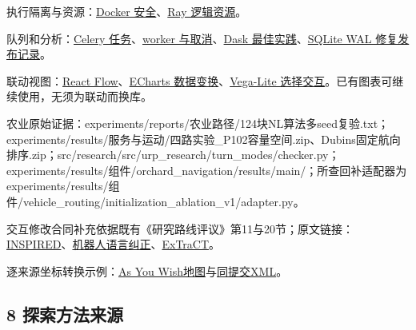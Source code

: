 \documentclass[11pt,a4paper]{article}
\newcommand{\referencetext}[1]{{\fontsize{9.4}{14.2}\selectfont#1\par}}
\begin{document}
\referencetext{[T20] 执行隔离与资源：\href{https://docs.docker.com/engine/security/}{Docker 安全}、\href{https://docs.ray.io/en/latest/ray-core/scheduling/resources.html}{Ray 逻辑资源}。}
\referencetext{[T21] 队列和分析：\href{https://docs.celeryq.dev/en/stable/userguide/tasks.html}{Celery 任务}、\href{https://docs.celeryq.dev/en/stable/userguide/workers.html}{worker 与取消}、\href{https://docs.dask.org/en/stable/best-practices.html}{Dask 最佳实践}、\href{https://sqlite.org/releaselog/3\_51\_3.html}{SQLite WAL 修复发布记录}。}
\referencetext{[T26] 联动视图：\href{https://reactflow.dev/index}{React Flow}、\href{https://echarts.apache.org/handbook/en/concepts/data-transform/}{ECharts 数据变换}、\href{https://github.com/vega/vega-lite/blob/main/site/docs/parameter/select.md}{Vega-Lite 选择交互}。已有图表可继续使用，无须为联动而换库。}
\referencetext{[T28] 农业原始证据：experiments/\allowbreak{}reports/\allowbreak{}农业路径/\allowbreak{}124块NL算法多seed复验.txt；experiments/\allowbreak{}results/\allowbreak{}服务与运动/\allowbreak{}四路实验\_\allowbreak{}P102容量空间.zip、Dubins固定航向排序.zip；src/\allowbreak{}research/\allowbreak{}src/\allowbreak{}urp\_\allowbreak{}research/\allowbreak{}turn\_\allowbreak{}modes/\allowbreak{}checker.py；experiments/\allowbreak{}results/\allowbreak{}组件/\allowbreak{}orchard\_\allowbreak{}navigation/\allowbreak{}results/\allowbreak{}main/\allowbreak{}；所查回补适配器为 experiments/\allowbreak{}results/\allowbreak{}组件/\allowbreak{}vehicle\_\allowbreak{}routing/\allowbreak{}initialization\_\allowbreak{}ablation\_\allowbreak{}v1/\allowbreak{}adapter.py。}
\referencetext{[Tinteraction1] 交互修改合同补充依据既有《研究路线评议》第11与20节；原文链接：\href{https://aclanthology.org/2022.findings-acl.28/}{INSPIRED}、\href{https://arxiv.org/abs/2204.05186}{机器人语言纠正}、\href{https://arxiv.org/abs/2401.03701}{ExTraCT}。}
\referencetext{[Tinteraction2] 逐来源坐标转换示例：\href{https://github.com/ucmercedrobotics/gpt-mission-planner/blob/6c0aa5706f58fb22bd98b6ddd1968be1681c1d16/app/resources/context/wheeled\_bots/reza\_medium.geojson}{As You Wish地图}与\href{https://github.com/ucmercedrobotics/gpt-mission-planner/blob/6c0aa5706f58fb22bd98b6ddd1968be1681c1d16/app/gpt\_outputs/gpt\_example.xml\#L11-L44}{同提交XML}。}
\subsection{8  探索方法来源}
\end{document}
